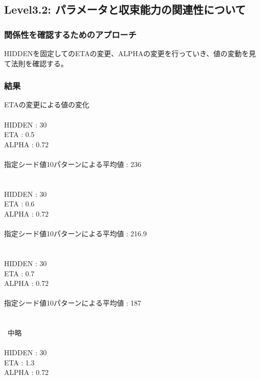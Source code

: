 \subsection{Level3.2: パラメータと収束能力の関連性について}
\subsubsection{関係性を確認するためのアプローチ}
HIDDENを固定してのETAの変更、ALPHAの変更を行っていき、値の変動を見て法則を確認する。

\subsubsection{結果}
ETAの変更による値の変化\\\\
HIDDEN : 30\\
ETA        : 0.5\\
ALPHA   : 0.72\\\\

指定シード値10パターンによる平均値 : 236\\

\\\\
HIDDEN : 30\\
ETA        : 0.6\\
ALPHA   : 0.72\\\\

指定シード値10パターンによる平均値 : 216.9\\

\\\\
HIDDEN : 30\\
ETA        : 0.7\\
ALPHA   : 0.72\\\\

指定シード値10パターンによる平均値 : 187\\


\\\\

~中略~\\\\

HIDDEN : 30\\
ETA        : 1.3\\
ALPHA   : 0.72\\\\

